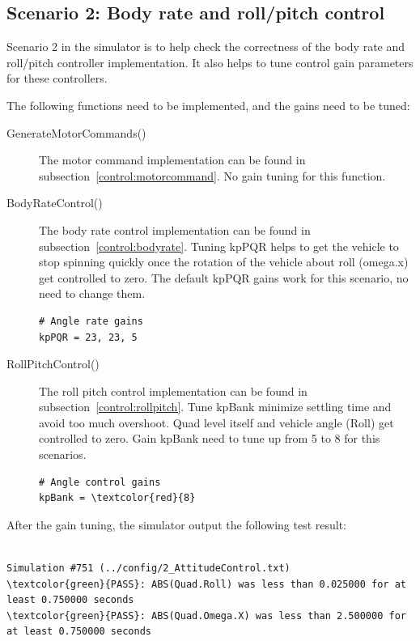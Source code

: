 \documentclass[a4paper]{article}
\begin{document}
\subsection{Scenario 2: Body rate and roll/pitch control}

Scenario 2 in the simulator is to help check the correctness of the body rate and roll/pitch controller implementation. It also helps to tune control gain parameters for these controllers.

The following functions need to be implemented, and the gains need to be tuned: 
\begin{description}

\item [GenerateMotorCommands()] The motor command implementation can be found in subsection~\ref{control:motorcommand}. No gain tuning for this function.

\item [BodyRateControl()] The body rate control implementation can be found in subsection~\ref{control:bodyrate}. Tuning kpPQR helps to get the vehicle to stop spinning quickly once the rotation of the vehicle about roll (omega.x) get controlled to zero. The default kpPQR gains work for this scenario, no need to change them.
\begin{Verbatim}[frame=single]
# Angle rate gains
kpPQR = 23, 23, 5
\end{Verbatim} 

\item [RollPitchControl()] The roll pitch control implementation can be found in subsection~\ref{control:rollpitch}. Tune kpBank minimize settling time and avoid too much overshoot. Quad level itself and vehicle angle (Roll) get controlled to zero. Gain kpBank need to tune up from 5 to 8 for this scenarios.
\begin{Verbatim}[frame=single,commandchars=\\\{\}]
# Angle control gains
kpBank = \textcolor{red}{8}
\end{Verbatim} 

\end{description}

After the gain tuning, the simulator output the following test result:
\begin{Verbatim}[frame=lines, label=Simulator Test Result Output, commandchars=\\\{\}]

Simulation #751 (../config/2_AttitudeControl.txt)
\textcolor{green}{PASS}: ABS(Quad.Roll) was less than 0.025000 for at least 0.750000 seconds
\textcolor{green}{PASS}: ABS(Quad.Omega.X) was less than 2.500000 for at least 0.750000 seconds
\end{Verbatim} 
\end{document}
